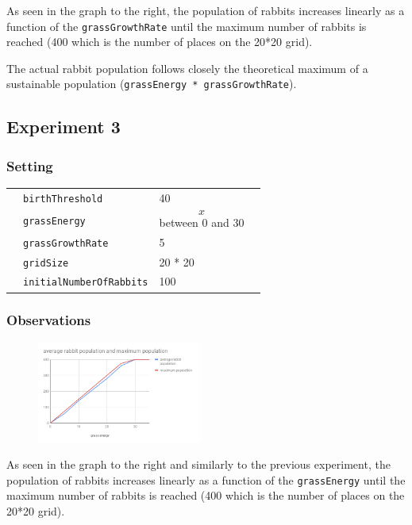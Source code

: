 \documentclass[11pt]{article}
\begin{document}
 As seen in the graph to the right, the population of rabbits increases 
 linearly as a function of the \texttt{grassGrowthRate} until the maximum number of 
 rabbits is reached (400 which is the number of places on the 20*20 grid).

 The actual rabbit population follows closely the theoretical maximum of a 
 sustainable population (\texttt{grassEnergy * grassGrowthRate}).


 \subsection{Experiment 3}
 \subsubsection{Setting}
 \begin{table}[H]
  \begin{tabular}{llll}
   &\texttt{birthThreshold }  &40\\
   &\texttt{grassEnergy}  & $$x$$ between 0 and 30 \\
   &\texttt{grassGrowthRate}  &5\\
   &\texttt{gridSize}  &20 * 20\\
   &\texttt{initialNumberOfRabbits}  &100
  \end{tabular}
 \end{table}

 \subsubsection{Observations}
  \begin{figure}
  \vspace{-20pt}
  \begin{center}
    \includegraphics[width=0.48\textwidth]{grassenergy.png}
  \end{center}
  \vspace{-20pt}
\end{figure}

 As seen in the graph to the right and similarly to the previous experiment, 
 the population of rabbits increases 
 linearly as a function of the \texttt{grassEnergy} until the maximum number of 
 rabbits is reached (400 which is the number of places on the 20*20 grid).
\end{document}
